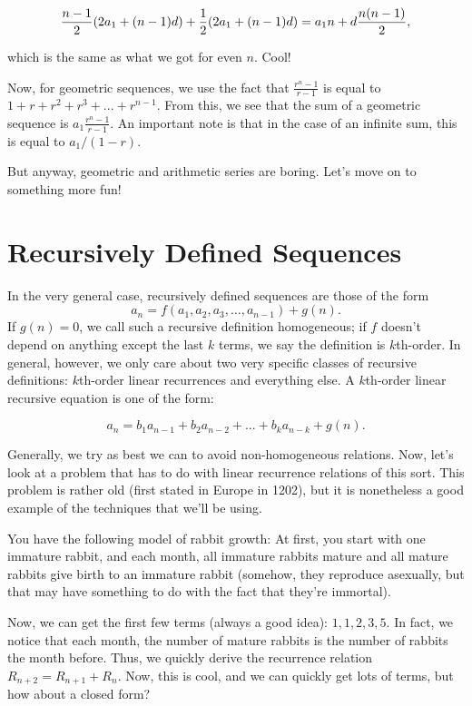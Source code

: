 \documentclass[12pt,letterpaper]{article}
\begin{document}
$$\frac{n-1}{2}(2a_1 + (n-1)d) + \frac{1}{2}(2a_1 + (n-1)d) \\
= a_1 n + d \frac{n (n-1)}{2},$$

which is the same as what we got for even $n$. Cool!

Now, for geometric sequences, we use the fact that $\frac{r^n - 1}{r
  - 1}$ is equal to $1 + r + r^2 + r^3 + ... + r^{n-1}$. From this, we
see that the sum of a geometric sequence is $a_1 \frac{r^n - 1}{r -
  1}$. An important note is that in the case of an infinite sum, this
is equal to $a_1/(1 - r)$.

But anyway, geometric and arithmetic series are boring. Let's move on to
something more fun!

\section{Recursively Defined Sequences}
In the very general case, recursively defined sequences are those of
the form $$a_n = f(a_1, a_2, a_3, \ldots, a_{n-1}) + g(n).$$ If $g(n) = 0$,
we call such a recursive definition homogeneous; if $f$ doesn't depend
on anything except the last $k$ terms, we say the definition is
$k$th-order. In general, however, we only care about two very
specific classes of recursive definitions: $k$th-order linear recurrences and
everything else. A $k$th-order linear recursive equation is one of
the form:

$$a_n = b_1 a_{n-1} + b_2 a_{n-2} + ... + b_k a_{n - k} + g(n).$$

Generally, we try as best we can to avoid non-homogeneous
relations. Now, let's look at a problem that has to do with linear
recurrence relations of this sort. This problem is rather old (first stated
in Europe in 1202), but it is nonetheless a
good example of the techniques that we'll be using.

You have the following model of rabbit growth: At first, you start
with one immature rabbit, and each month, all immature rabbits mature
and all mature rabbits give birth to an immature rabbit (somehow, they
reproduce asexually, but that may have something to do with the fact
that they're immortal).

Now, we can get the first few terms (always a good idea): $1, 1, 2, 3,
5$.  In fact, we notice that each month, the number of mature rabbits
is the number of rabbits the month before. Thus, we quickly derive the
recurrence relation $R_{n+2} = R_{n+1} + R_n$. Now, this is cool, and
we can quickly get lots of terms, but how about a closed form?
\end{document}
